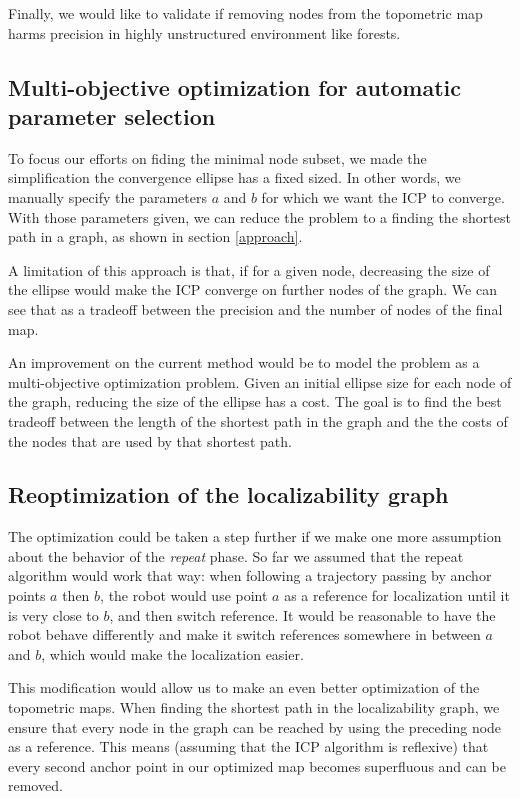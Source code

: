 \documentclass[letterpaper,10 pt,conference]{ieeeconf}
\begin{document}
Finally, we would like to validate if removing nodes from the topometric map harms precision in highly unstructured environment like forests.

\subsection{Multi-objective optimization for automatic parameter selection}

To focus our efforts on fiding the minimal node subset, we made the simplification
the convergence ellipse has a fixed sized. In other words, we manually specify
the parameters $a$ and $b$ for which we want the ICP to converge. With those
parameters given, we can reduce the problem to a finding the shortest path in a
graph, as shown in section \ref{approach}.

A limitation of this approach is that, if for a given node, decreasing the size of the ellipse would
make the ICP converge on further nodes of the graph. We can see that as a tradeoff between the
precision and the number of nodes of the final map.

An improvement on the current method would be to model the problem as a multi-objective optimization
problem. Given an initial ellipse size for each node of the graph, reducing the size of the
ellipse has a cost. The goal is to find the best tradeoff between the length of the shortest path in
the graph and the the costs of the nodes that are used by that shortest path.

\subsection{Reoptimization of the localizability graph}

The optimization could be taken a step further if we make one more assumption about the behavior
of the \textit{repeat} phase. So far we assumed that the repeat algorithm would work that way: when
following a trajectory passing by anchor points $a$ then $b$, the robot would use point $a$ as a
reference for localization until it is very close to $b$, and then switch reference. It would be
reasonable to have the robot behave differently and make it switch references somewhere in between
$a$ and $b$, which would make the localization easier.

This modification would allow us to make an even better optimization of the topometric maps. When
finding the shortest path in the localizability graph, we ensure that every node in the graph can be
reached by using the preceding node as a reference. This means (assuming that the ICP algorithm is
reflexive) that every second anchor point in our optimized map becomes superfluous and can be removed.
\end{document}
